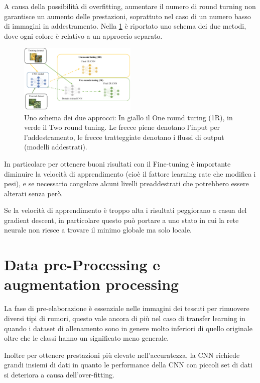A causa della possibilità di \gls{overfitting}, aumentare il numero di round turning non garantisce un aumento delle prestazioni, soprattuto nel caso di un numero basso di immagini in addestramento\cite{lumini_plankton}. Nella \cref{fig:tl_2rt}  è riportato uno schema dei due metodi, dove ogni colore è relativo a un approccio separato. 

\begin{figure}[ht]
    \centering
    \includegraphics[width=0.5\textwidth]{transfer-learning/tl_2rt.pdf}
    \caption{Uno schema dei due approcci: In giallo il One round turing (1R), in verde il Two round tuning. Le frecce piene denotano l'input per l'addestramento, le frecce tratteggiate denotano i flussi di output (modelli addestrati).}
    \label{fig:tl_2rt}
\end{figure}

In particolare per ottenere buoni risultati con il Fine-tuning è importante diminuire la velocità di apprendimento (cioè il fattore learning rate che modifica i pesi), e se necessario congelare alcuni livelli preaddestrati che potrebbero essere alterati senza però.

Se la velocità di apprendimento è troppo alta i risultati peggiorano a casua del gradient descent, in particolare questo può portare a uno stato in cui la rete neurale non riesce a trovare il minimo globale ma solo locale\cite{joel_ft_tl_lfs}\cite{joel_tl}.

\section{Data pre-Processing e augmentation processing}\label{data-pre-processing-e-augmentation-processing}

La fase di pre-elaborazione è essenziale nelle immagini dei tessuti per rimuovere diversi tipi di rumori, questo vale ancora di più nel caso di transfer learning in quando i dataset di allenamento sono in genere molto inferiori di quello originale oltre che le classi hanno un significato meno generale\cite{joel_tl}.

Inoltre per ottenere prestazioni più elevate nell'accuratezza, la CNN richiede grandi insiemi di dati in quanto le performance della CNN con piccoli set di dati si deteriora  a causa dell'over-fitting\cite{joel_tl}.





